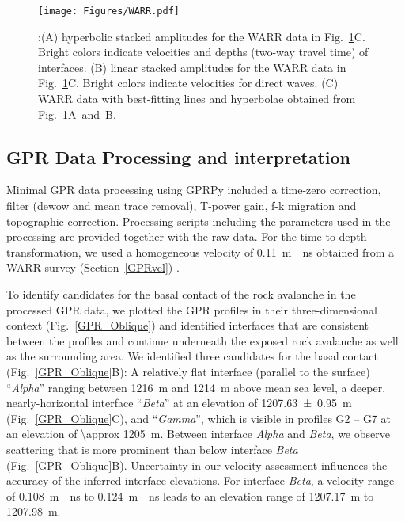 \documentclass[utf8]{frontiersSCNS}
\begin{document}
	                                 \begin{figure}

	\texttt{[image: Figures/WARR.pdf]}
		\caption{:(A) hyperbolic stacked amplitudes for the WARR data in Fig.~\ref{WARR}C. Bright colors indicate velocities and depths (two-way travel time) of interfaces. (B) linear stacked amplitudes for the WARR data in Fig.~\ref{WARR}C. Bright colors indicate velocities for direct waves. (C) WARR data with best-fitting lines and hyperbolae obtained from Fig.~\ref{WARR}A~and~B.\label{WARR}}
		
		                        	   \end{figure}



\subsection{GPR Data Processing and interpretation}

Minimal GPR data processing using GPRPy \citep{plattner2019comunity,plattner2020GPRPy} included a time-zero correction, filter (dewow and mean trace removal), T-power gain, f-k migration \citep{stolt1978migration} and topographic correction. Processing scripts including the parameters used in the processing are provided together with the raw data. For the time-to-depth transformation, we used a homogeneous velocity of \SI{0.11}{m \per ns} obtained from a WARR survey (Section~\ref{GPRvel}) \citep{annan1976impulse, davis1989ground}. 

To identify candidates for the basal contact of the rock avalanche in the processed GPR data, we plotted the GPR profiles in their three-dimensional context (Fig.~\ref{GPR_Oblique}) and identified interfaces that are consistent between the profiles and continue underneath the exposed rock avalanche as well as the surrounding area. We identified three candidates for the basal contact (Fig.~\ref{GPR_Oblique}B): A relatively flat interface (parallel to the surface) ``\emph{Alpha}'' ranging between \SI{1216}{m} and \SI{1214}{m} above mean sea level, a deeper, nearly-horizontal interface ``\emph{Beta}''  at an elevation of \SI{1207.63 \pm 0.95}{\m} (Fig.~\ref{GPR_Oblique}C), and ``\emph{Gamma}'', which is visible in profiles G2 -- G7 at an elevation of \SI{\approx 1205}{m}. Between interface \emph{Alpha} and \emph{Beta}, we observe scattering that is more prominent than below interface \emph{Beta} (Fig.~\ref{GPR_Oblique}B). Uncertainty in our velocity assessment influences the accuracy of the inferred interface elevations. For interface \emph{Beta}, a velocity range of \SI{0.108}{m \per ns} to \SI{0.124}{m \per ns} leads to an elevation range of \SI{1207.17}{m} to \SI{1207.98}{m}.
\end{document}
